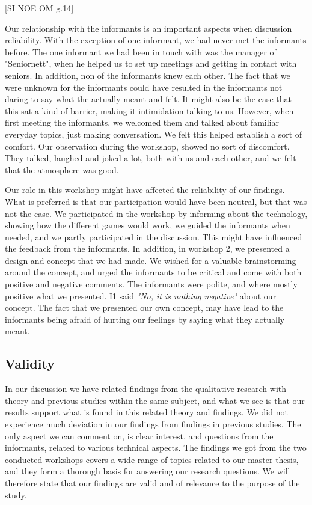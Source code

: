 [SI NOE OM g.14]

Our relationship with the informants is an important aspects when discussion reliability. With the exception of one informant, we had never met the informants before. The one informant we had been in touch with was the manager of "Seniornett", when he helped us to set up meetings and getting in contact with seniors. In addition, non of the informants knew each other. The fact that we were unknown for the informants could have resulted in the informants not daring to say what the actually meant and felt. It might also be the case that this sat a kind of barrier, making it intimidation talking to us. However, when first meeting the informants, we welcomed them and talked about familiar everyday topics, just making conversation. We felt this helped establish a sort of comfort. Our observation during the workshop, showed no sort of discomfort. They talked, laughed and joked a lot, both with us and each other, and we felt that the atmosphere was good. 

Our role in this workshop might have affected the reliability of our findings. What is preferred is that our participation would have been neutral, but that was not the case. We participated in the workshop by informing about the technology, showing how the different games would work, we guided the informants when needed, and we partly participated in the discussion. This might have influenced the feedback from the informants. In addition, in workshop 2, we presented a design and concept that we had made. We wished for a valuable brainstorming around the concept, and urged the informants to be critical and come with both positive and negative comments. The informants were polite, and where mostly positive what we presented. I1 said \emph{"No, it is nothing negative"} about our concept. The fact that we presented our own concept, may have lead to the informants being afraid of hurting our feelings by saying what they actually meant. 


\subsection{Validity}

In our discussion we have related findings from the qualitative research with theory and previous studies within the same subject, and what we see is that our results support what is found in this related theory and findings. We did not experience much deviation in our findings from findings in previous studies. The only aspect we can comment on, is clear interest, and questions from the informants, related to various technical aspects. The findings we got from the two conducted workshops covers a wide range of topics related to our master thesis, and they form a thorough basis for answering our research questions. We will therefore state that our findings are valid and of relevance to the purpose of the study. 

